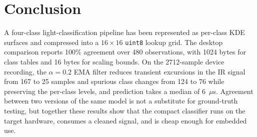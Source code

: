 \documentclass[conference]{IEEEtran}
\begin{document}
\section{Conclusion}
A four-class light-classification pipeline has been represented as per-class KDE surfaces and compressed into a $16\times16$ \texttt{uint8} lookup grid. The desktop comparison reports 100\% agreement over 480 observations, with 1024 bytes for class tables and 16 bytes for scaling bounds. On the 2712-sample device recording, the $\alpha=0.2$ EMA filter reduces transient excursions in the IR signal from 167 to 25 samples and spurious class changes from 124 to 76 while preserving the per-class levels, and prediction takes a median of 6~$\mu$s. Agreement between two versions of the same model is not a substitute for ground-truth testing, but together these results show that the compact classifier runs on the target hardware, consumes a cleaned signal, and is cheap enough for embedded use.
\end{document}

